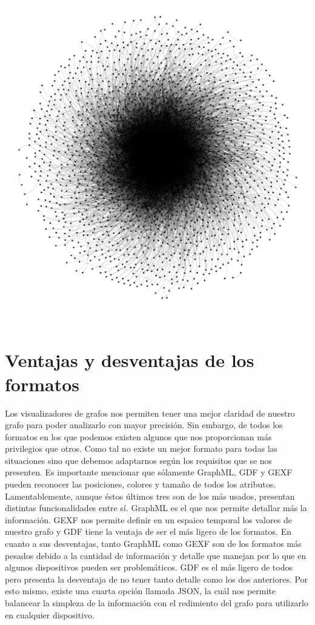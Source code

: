 \documentclass[conference]{IEEEtran}
\begin{document}
\includegraphics[width=\linewidth]{grafo}
\ 

\section{Ventajas y desventajas de los formatos}
Los visualizadores de grafos nos permiten tener una mejor claridad de nuestro grafo para poder analizarlo con mayor precisión. Sin embargo, de todos los formatos en los que podemos existen algunos que nos proporcionan más privilegios que otros. Como tal no existe un mejor formato para todas las situaciones sino que debemos adaptarnos según los requisitos que se nos presenten. Es importante mencionar que sólamente GraphML, GDF y GEXF pueden reconocer las posiciones, colores y tamaño de todos los atributos. Lamentablemente, aunque éstos últimos tres son de los más usados, presentan distintas funcionalidades entre sí. GraphML es el que nos permite detallar más la información. GEXF nos permite definir en un espaico temporal los valores de nuestro grafo y GDF tiene la ventaja de ser el más ligero de los formatos. En cuanto a sus desventajas,  tanto GraphML como GEXF son de los formatos más pesados debido a la cantidad de información y detalle que manejan por lo que en algunos dispositivos pueden ser problemáticos. GDF es el más ligero de todos pero presenta la desventaja de no tener tanto detalle como los dos anteriores. Por esto mismo, existe una cuarta opción llamada JSON, la cuál nos permite balancear la simpleza de la información con el redimiento del grafo para utilizarlo en cualquier dispositivo.
\end{document}
